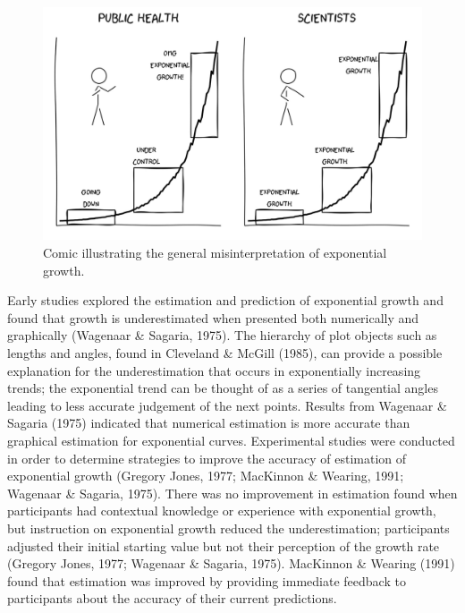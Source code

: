 \documentclass[print]{nuthesis}
\begin{document}
\begin{figure}[tbp]

{\centering \includegraphics[width=1\linewidth,]{images/exponential-stages-comic} 

}

\caption[Log scale comic]{Comic illustrating the general misinterpretation of exponential growth.}\label{fig:exponential-stages-comic}
\end{figure}

Early studies explored the estimation and prediction of exponential growth and found that growth is underestimated when presented both numerically and graphically (Wagenaar \& Sagaria, 1975).
The hierarchy of plot objects such as lengths and angles, found in Cleveland \& McGill (1985), can provide a possible explanation for the underestimation that occurs in exponentially increasing trends; the exponential trend can be thought of as a series of tangential angles leading to less accurate judgement of the next points.
Results from Wagenaar \& Sagaria (1975) indicated that numerical estimation is more accurate than graphical estimation for exponential curves.
Experimental studies were conducted in order to determine strategies to improve the accuracy of estimation of exponential growth (Gregory Jones, 1977; MacKinnon \& Wearing, 1991; Wagenaar \& Sagaria, 1975).
There was no improvement in estimation found when participants had contextual knowledge or experience with exponential growth, but instruction on exponential growth reduced the underestimation; participants adjusted their initial starting value but not their perception of the growth rate (Gregory Jones, 1977; Wagenaar \& Sagaria, 1975).
MacKinnon \& Wearing (1991) found that estimation was improved by providing immediate feedback to participants about the accuracy of their current predictions.
\end{document}
